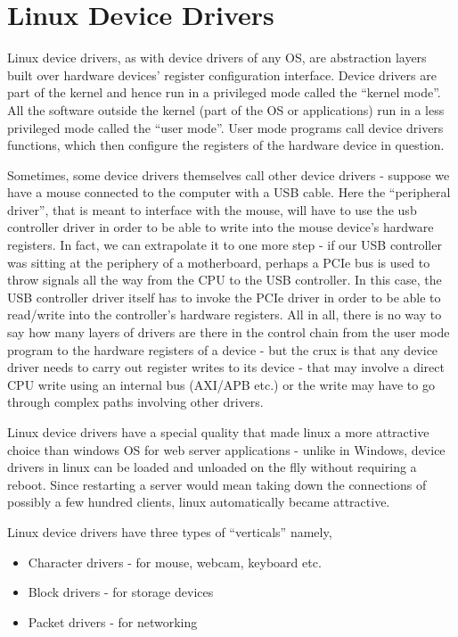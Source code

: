 \chapter{Linux Device Drivers}
Linux device drivers, as with device drivers of any OS, are abstraction layers built over hardware devices' register configuration interface. Device drivers are part of the kernel and hence run in a privileged mode called the ``kernel mode''. All the software outside the kernel (part of the OS or applications) run in a less privileged mode called the ``user mode''. User mode programs call device drivers functions, which then configure the registers of the hardware device in question. 

Sometimes, some device drivers themselves call other device drivers - suppose we have a mouse connected to the computer with a USB cable. Here the ``peripheral driver'', that is meant to interface with the mouse, will have to use the usb controller driver in order to be able to write into the mouse device's hardware registers. In fact, we can extrapolate it to one more step - if our USB controller was sitting at the periphery of a motherboard, perhaps a PCIe bus is used to throw signals all the way from the CPU to the USB controller. In this case, the USB controller driver itself has to invoke the PCIe driver in order to be able to read/write into the controller's hardware registers. All in all, there is no way to say how many layers of drivers are there in the control chain from the user mode program to the hardware registers of a device - but the crux is that any device driver needs to carry out register writes to its device - that may involve a direct CPU write using an internal bus (AXI/APB etc.) or the write may have to go through complex paths involving other drivers. 

Linux device drivers have a special quality that made linux a more attractive choice than windows OS for web server applications - unlike in Windows, device drivers in linux can be loaded and unloaded on the flly without requiring a reboot. Since restarting a server would mean taking down the connections of possibly a few hundred clients, linux automatically became attractive. 

Linux device drivers have three types of ``verticals'' namely, 
	\begin{itemize}
	\item Character drivers - for mouse, webcam, keyboard etc.
	\item Block drivers - for storage devices
	\item Packet drivers - for networking
	\end{itemize}
	

